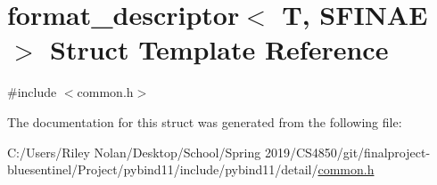\hypertarget{structformat__descriptor}{}\section{format\+\_\+descriptor$<$ T, S\+F\+I\+N\+AE $>$ Struct Template Reference}
\label{structformat__descriptor}


{\ttfamily \#include $<$common.\+h$>$}



The documentation for this struct was generated from the following file\+:\begin{DoxyCompactItemize}
\item 
C\+:/\+Users/\+Riley Nolan/\+Desktop/\+School/\+Spring 2019/\+C\+S4850/git/finalproject-\/bluesentinel/\+Project/pybind11/include/pybind11/detail/\mbox{\hyperlink{detail_2common_8h}{common.\+h}}\end{DoxyCompactItemize}
